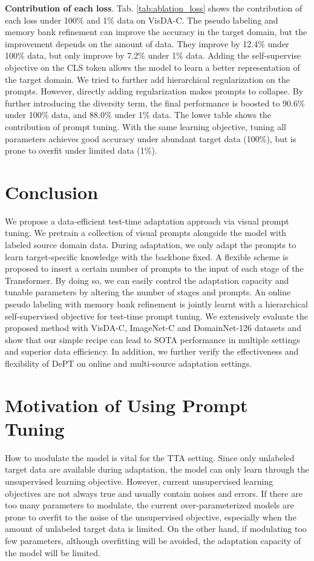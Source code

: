 \documentclass{article} \usepackage{iclr2023_conference,times}
\begin{document}
\textbf{Contribution of each loss}.
Tab. \ref{tab:ablation_loss} shows the contribution of each loss under 100\% and 1\% data on VisDA-C. The pseudo labeling and memory bank refinement can improve the accuracy in the target domain, but the improvement depends on the amount of data. They improve by 12.4\% under 100\% data, but only improve by 7.2\% under 1\% data. Adding the self-supervise objective on the CLS token allows the model to learn a better representation of the target domain. We tried to further add hierarchical regularization on the prompts. However, directly adding regularization makes prompts to collapse. By further introducing the diversity term, the final performance is boosted to 90.6\% under 100\% data, and 88.0\% under 1\% data. The lower table shows the contribution of prompt tuning. With the same learning objective, tuning all parameters achieves good accuracy under abundant target data (100\%), but is prone to overfit under limited data (1\%).


\section{Conclusion}
We propose a data-efficient test-time adaptation approach via visual prompt tuning. We pretrain a collection of visual prompts alongside the model with labeled source domain data. During adaptation, we only adapt the prompts to learn target-specific knowledge with the backbone fixed. A flexible scheme is proposed to insert a certain number of  prompts to the input of each stage of the Transformer. By doing so, we can easily control the adaptation capacity and tunable parameters by altering the number of stages and prompts. An online pseudo labeling with memory bank refinement is jointly learnt with a hierarchical self-supervised objective for test-time prompt tuning.  We extensively evaluate the proposed method with VisDA-C, ImageNet-C and DomainNet-126 datasets and show that our simple recipe can lead to SOTA performance in multiple settings and superior data efficiency. In addition, we further verify the effectiveness and flexibility of DePT on online and multi-source adaptation settings.

\newpage



\newpage
\appendix

\section{Motivation of Using Prompt Tuning} \label{appendix:motivation}
How to modulate the model is vital for the TTA setting. Since only unlabeled target data are available during adaptation, the model can only learn through the unsupervised learning objective. However, current unsupervised learning objectives are not always true and usually contain noises and errors. If there are too many parameters to modulate, the current over-parameterized models are prone to overfit to the noise of the unsupervised objective, especially when the amount of unlabeled target data is limited. On the other hand, if modulating too few parameters, although overfitting will be avoided, the adaptation capacity of the model will be limited.
 
\end{document}
